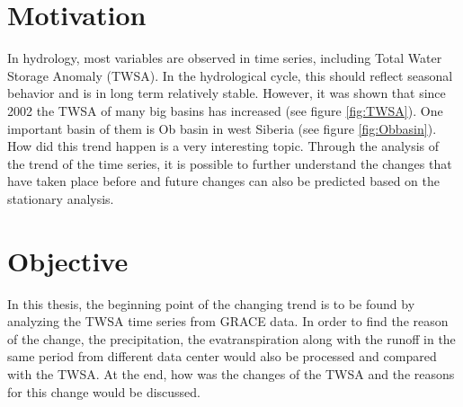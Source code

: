 \section{Motivation}
In hydrology, most variables are observed in time series, including Total Water Storage Anomaly (TWSA). In the hydrological cycle, this should reflect seasonal behavior and is in long term relatively stable. However, it was shown that since 2002 the TWSA of many big basins has increased (see figure \ref{fig:TWSA}). One important basin of them is Ob basin in west Siberia (see figure \ref{fig:Obbasin}). How did this trend happen is a very interesting topic. Through the analysis of the trend of the time series, it is possible to further understand the changes that have taken place before and future changes can also be predicted based on the stationary analysis.
\section{Objective}
In this thesis, the beginning point of the changing trend is to be found by analyzing the TWSA time series from GRACE data. In order to find the reason of the change, the precipitation, the evatranspiration along with the runoff in the same period from different data center would also be processed and compared with the TWSA. At the end, how was the changes of the TWSA and the reasons for this change would be discussed. 
